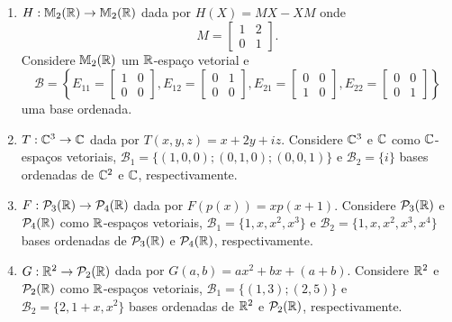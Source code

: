 \documentclass[12pt]{exam}
\begin{document}
\begin{exercicio}
\begin{enumerate}[label={\alph*})]
        \item $H : \mathbb{M}_2(\mathbb{R}) \to \mathbb{M}_2(\mathbb{R})$ dada por $H(X) = MX - XM$ onde
        \[
        M = \begin{bmatrix}
            1 & 2\\
            0 & 1
        \end{bmatrix}.
        \]
        Considere $\mathbb{M}_2(\mathbb{R})$ um $\mathbb{R}$-espaço vetorial e
        \[
        \mathcal{B} = \left\{E_{11} = \begin{bmatrix}
            1 & 0\\0 & 0
        \end{bmatrix}, E_{12} = \begin{bmatrix}
            0 & 1\\0 & 0
        \end{bmatrix}, E_{21} = \begin{bmatrix}
            0 & 0\\1 & 0
        \end{bmatrix}, E_{22} = \begin{bmatrix}
            0 & 0\\0 & 1
        \end{bmatrix}\right\}
        \]
        uma base ordenada.

        \item $T : \mathbb{C}^3 \to \mathbb{C}$ dada por $T(x,y,z) = x + 2y + iz$. Considere $\mathbb{C}^3$ e $\mathbb{C}$ como $\mathbb{C}$-espaços vetoriais, $\mathcal{B}_1 = \{(1,0,0); (0,1,0); (0,0,1)\}$ e $\mathcal{B}_2 = \{i\}$ bases ordenadas de $\mathbb{C}^2$ e $\mathbb{C}$, respectivamente.

        \item $F : \mathcal{P}_3(\mathbb{R}) \to \mathcal{P}_4(\mathbb{R})$ dada por $F(p(x)) = xp(x + 1)$. Considere $\mathcal{P}_3(\mathbb{R})$ e $\mathcal{P}_4(\mathbb{R})$ como $\mathbb{R}$-espaços vetoriais, $\mathcal{B}_1 = \{1, x, x^2, x^3\}$ e $\mathcal{B}_2 = \{1, x, x^2, x^3, x^4\}$ bases ordenadas de $\mathcal{P}_3(\mathbb{R})$ e $\mathcal{P}_4(\mathbb{R})$, respectivamente.

        \item $G : \mathbb{R}^2 \to \mathcal{P}_2(\mathbb{R})$ dada por $G(a,b) = ax^2 + bx + (a + b)$. Considere $\mathbb{R}^2$ e $\mathcal{P}_2(\mathbb{R})$ como $\mathbb{R}$-espaços vetoriais, $\mathcal{B}_1 = \{(1,3); (2,5)\}$ e $\mathcal{B}_2 = \{2, 1 + x, x^2\}$ bases ordenadas de $\mathbb{R}^2$ e $\mathcal{P}_2(\mathbb{R})$, respectivamente.


\end{enumerate}
\end{exercicio}
\end{document}
